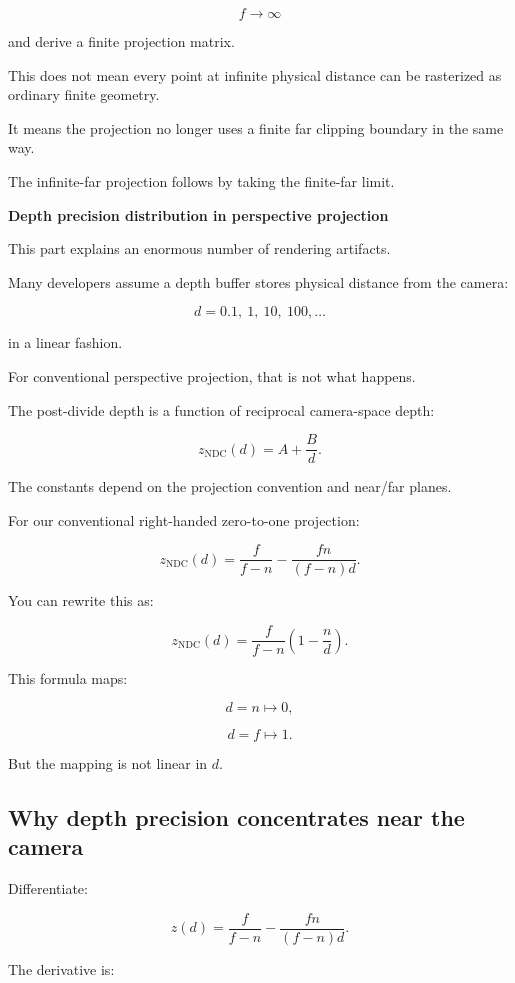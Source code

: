 \[
 f\to\infty
\]

and derive a finite projection matrix.

This does not mean every point at infinite physical distance can be rasterized as ordinary finite geometry.

It means the projection no longer uses a finite far clipping boundary in the same way.

The infinite-far projection follows by taking the finite-far limit.

\textbf{Depth precision distribution in perspective projection}

This part explains an enormous number of rendering artifacts.

Many developers assume a depth buffer stores physical distance from the camera:

\[
 d=0.1,\ 1,\ 10,\ 100,\ldots
\]

in a linear fashion.

For conventional perspective projection, that is not what happens.

The post-divide depth is a function of reciprocal camera-space depth:

\[
 \boxed{ z_{\mathrm{NDC}}(d)=A+\frac Bd }.
\]

The constants depend on the projection convention and near/far planes.

For our conventional right-handed zero-to-one projection:

\[
 \boxed{ z_{\mathrm{NDC}}(d) = \frac f{f-n} - \frac{fn}{(f-n)d} }.
\]

You can rewrite this as:

\[
 \boxed{ z_{\mathrm{NDC}}(d) = \frac f{f-n}\left(1-\frac nd\right) }.
\]

This formula maps:

\[
 d=n\mapsto0,
\]

\[
 d=f\mapsto1.
\]

But the mapping is not linear in \(d\).

\subsection{Why depth precision concentrates near the camera}\label{02-foundations-ii-ch033-why-depth-precision-concentrates-near-the-camera}

Differentiate:

\[
 z(d)= \frac f{f-n} - \frac{fn}{(f-n)d}.
\]

The derivative is:

